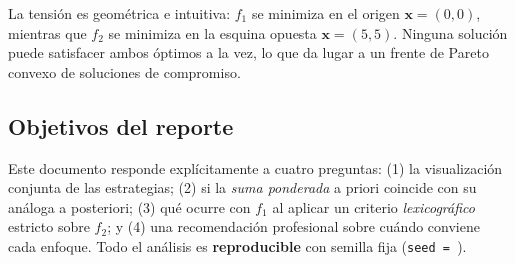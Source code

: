 La tensión es geométrica e intuitiva: $f_1$ se minimiza en el origen
$\mathbf{x}=(0,0)$, mientras que $f_2$ se minimiza en la esquina opuesta
$\mathbf{x}=(5,5)$. Ninguna solución puede satisfacer ambos óptimos a la vez,
lo que da lugar a un frente de Pareto convexo de soluciones de compromiso.

\subsection{Objetivos del reporte}

Este documento responde explícitamente a cuatro preguntas: (1) la
visualización conjunta de las estrategias; (2) si la \emph{suma ponderada}
a priori coincide con su análoga a posteriori; (3) qué ocurre con $f_1$ al
aplicar un criterio \emph{lexicográfico} estricto sobre $f_2$; y (4) una
recomendación profesional sobre cuándo conviene cada enfoque. Todo el análisis
es \textbf{reproducible} con semilla fija (\texttt{seed = \MetSeed}).
